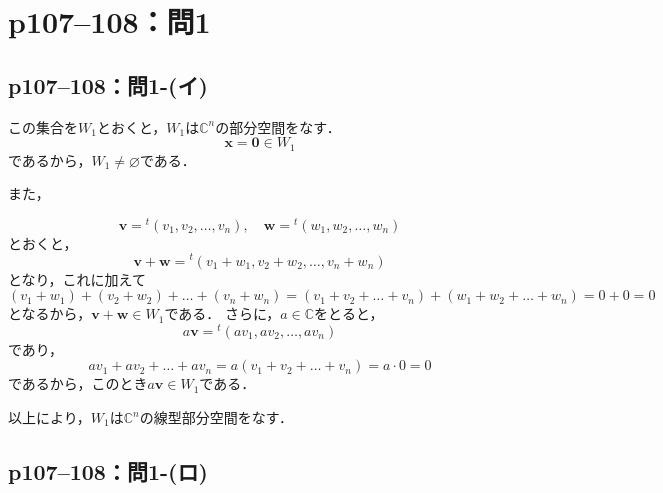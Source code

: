 \documentclass[a4paper,10pt,fleqn]{ltjsarticle}
\begin{document}
\newpage
\section*{p107--108：問1}


\subsection*{p107--108：問1-(イ)}


\begin{tleftbar}
  この集合を$W_1$とおくと，$W_1$は$\mathbb{C}^n$の部分空間をなす．
  \[
    \bm{x} =\bm{0} \in  W_1
  \]
  であるから，$W_1 \ne \varnothing$である．

  また，

  \[
    \bm{v} = {}^t ( v_{1} , v_{2} , \ldots ,v_{n} ) , \quad \bm{w} = {}^t (w_{1} , w_{2} , \ldots , w_{n} )
  \]
  とおくと，
  \[
    \bm{v}+\bm{w}={}^t (v_1+w_1,v_2+w_2,\ldots,v_n + w_n)
  \]
  となり，これに加えて
  \[
    ( v_1+w_1)+(v_2+w_2) + \dots + (v_n + w_n) =(v_1+v_2+\dots + v_n ) + (w_1+w_2+\dots + w_n )=0+0=0
  \]
  となるから，$\bm{v}+\bm{w} \in W_1$である．
  さらに，$a \in \mathbb{C}$をとると，
  \[
    a \bm{v}={}^t ( av_{1} ,av_{2} , \ldots , av_{n} )
  \]
  であり，
  \[
    av_1 + av_2+ \dots + av_n = a (v_1 + v_2 + \dots + v_n) = a \cdot 0 =0
  \]
  であるから，このとき$ a \bm{v} \in W_1$である．

  以上により，$W_1$は$\mathbb{C}^n$の線型部分空間をなす．
\end{tleftbar}


\subsection*{p107--108：問1-(ロ)}
\end{document}
